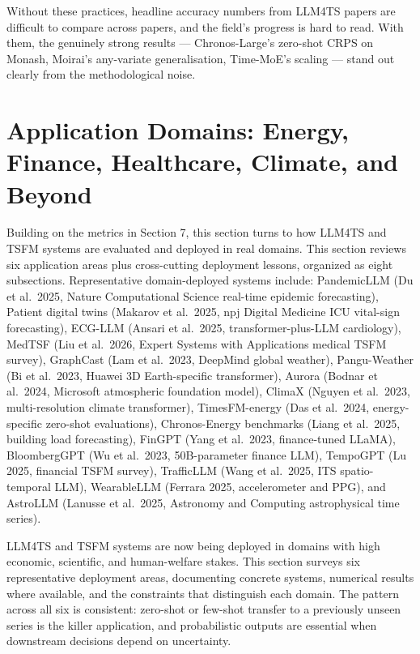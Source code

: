 Without these practices, headline accuracy numbers from LLM4TS papers are difficult to compare across papers, and the field's progress is hard to read. With them, the genuinely strong results --- Chronos-Large's zero-shot CRPS on Monash, Moirai's any-variate generalisation, Time-MoE's scaling --- stand out clearly from the methodological noise.

\section{Application Domains: Energy, Finance, Healthcare, Climate, and Beyond}\label{application-domains-energy-finance-healthcare-climate-and-beyond}

Building on the metrics in Section 7, this section turns to how LLM4TS and TSFM systems are evaluated and deployed in real domains. This section reviews six application areas plus cross-cutting deployment lessons, organized as eight subsections. Representative domain-deployed systems include: PandemicLLM (Du et al.~2025, Nature Computational Science real-time epidemic forecasting), Patient digital twins (Makarov et al.~2025, npj Digital Medicine ICU vital-sign forecasting), ECG-LLM (Ansari et al.~2025, transformer-plus-LLM cardiology), MedTSF (Liu et al.~2026, Expert Systems with Applications medical TSFM survey), GraphCast (Lam et al.~2023, DeepMind global weather), Pangu-Weather (Bi et al.~2023, Huawei 3D Earth-specific transformer), Aurora (Bodnar et al.~2024, Microsoft atmospheric foundation model), ClimaX (Nguyen et al.~2023, multi-resolution climate transformer), TimesFM-energy (Das et al.~2024, energy-specific zero-shot evaluations), Chronos-Energy benchmarks (Liang et al.~2025, building load forecasting), FinGPT (Yang et al.~2023, finance-tuned LLaMA), BloombergGPT (Wu et al.~2023, 50B-parameter finance LLM), TempoGPT (Lu 2025, financial TSFM survey), TrafficLLM (Wang et al.~2025, ITS spatio-temporal LLM), WearableLLM (Ferrara 2025, accelerometer and PPG), and AstroLLM (Lanusse et al.~2025, Astronomy and Computing astrophysical time series).

LLM4TS and TSFM systems are now being deployed in domains with high economic, scientific, and human-welfare stakes. This section surveys six representative deployment areas, documenting concrete systems, numerical results where available, and the constraints that distinguish each domain. The pattern across all six is consistent: zero-shot or few-shot transfer to a previously unseen series is the killer application, and probabilistic outputs are essential when downstream decisions depend on uncertainty.

